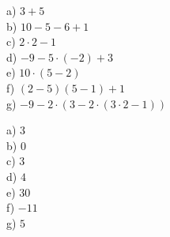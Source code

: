 \begin{tehtava}
a) $3+5$ \\
b) $10-5-6+1$ \\
c) $2 \cdot 2 - 1$ \\
d) $-9 - 5 \cdot (-2) + 3$ \\
e) $10 \cdot (5 - 2)$ \\
f) $(2-5)(5 - 1) + 1$ \\
g) $-9 - 2 \cdot ( 3 - 2 \cdot (3\cdot2 - 1))$
\begin{vastaus} 
a) $3$ \\
b) $0$ \\
c) $3$ \\
d) $4$ \\
e) $30$ \\
f) $-11$ \\
g) $5$ \\
\end{vastaus}
\end{tehtava}
